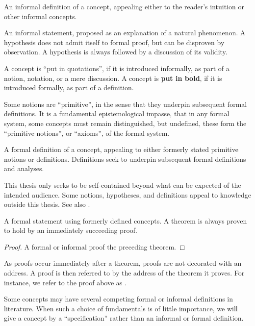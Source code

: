 \begin{notion} An informal definition of a concept, appealing either to the
reader's intuition or other informal concepts. \end{notion}

\begin{hypothesis} An informal statement, proposed as an explanation of a
natural phenomenon. A hypothesis does not admit itself to formal proof, but can
be disproven by observation. A hypothesis is always followed by a discussion of
its validity. \end{hypothesis}

A concept is ``put in quotations'', if it is introduced informally, as part of
a notion, notation, or a mere discussion. A concept is \textbf{put in bold}, if
it is introduced formally, as part of a definition.

Some notions are ``primitive'', in the sense that they underpin subsequent
formal definitions. It is a fundamental epistemological impasse, that in any
formal system, some concepts must remain distinguished, but undefined, these
form the ``primitive notions'', or ``axioms'', of the formal system.

\begin{definition} A formal definition of a concept, appealing to either
formerly stated primitive notions or definitions. Definitions seek to underpin
subsequent formal definitions and analyses. \end{definition}

This thesis only seeks to be self-contained beyond what can be expected of the
intended audience. Some notions, hypotheses, and definitions appeal to
knowledge outside this thesis. See also .

\begin{theorem} \label{thm:theorem} A formal statement using formerly defined
concepts. A theorem is always proven to hold by an immediately succeeding
proof.\end{theorem}

\begin{proof} A formal or informal proof the preceding theorem. \end{proof}

As proofs occur immediately after a theorem, proofs are not decorated with an
address. A proof is then referred to by the address of the theorem it proves.
For instance, we refer to the proof above as .

Some concepts may have several competing formal or informal definitions in
literature.  When such a choice of fundamentals is of little importance, we
will give a concept by a ``specification'' rather than an informal or formal
definition. 


